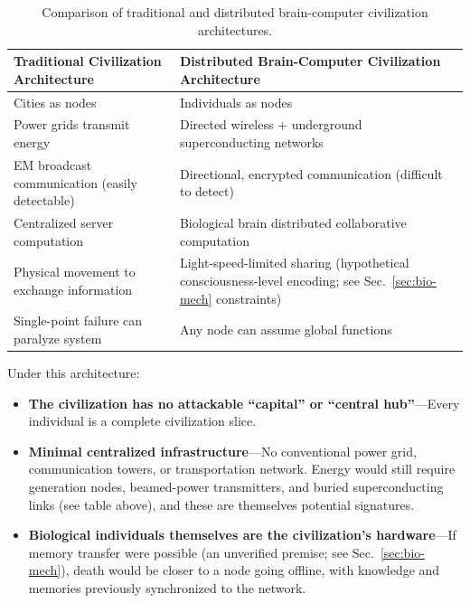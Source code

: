 \documentclass[aps,prd,twocolumn,superscriptaddress,nofootinbib]{revtex4-2}
\begin{document}
\begin{table}[htbp]
\caption{Comparison of traditional and distributed brain-computer civilization architectures.}
\label{tab:civ-architecture}
\footnotesize
\begin{tabular}{P{0.405\textwidth}P{0.516\textwidth}}
\toprule
Traditional Civilization Architecture & Distributed Brain-Computer Civilization Architecture \\
\midrule
Cities as nodes & Individuals as nodes \\
Power grids transmit energy & Directed wireless + underground superconducting networks \\
EM broadcast communication (easily detectable) & Directional, encrypted communication (difficult to detect) \\
Centralized server computation & Biological brain distributed collaborative computation \\
Physical movement to exchange information & Light-speed-limited sharing (hypothetical consciousness-level encoding; see Sec.~\ref{sec:bio-mech} constraints) \\
Single-point failure can paralyze system & Any node can assume global functions \\
\bottomrule
\end{tabular}
\end{table}

Under this architecture:

\begin{itemize}
  \item \textbf{The civilization has no attackable ``capital'' or ``central hub''}---Every individual is a complete civilization slice.
  \item \textbf{Minimal centralized infrastructure}---No conventional power grid, communication towers, or transportation network. Energy would still require generation nodes, beamed-power transmitters, and buried superconducting links (see table above), and these are themselves potential signatures.
  \item \textbf{Biological individuals themselves are the civilization's hardware}---If memory transfer were possible (an unverified premise; see Sec.~\ref{sec:bio-mech}), death would be closer to a node going offline, with knowledge and memories previously synchronized to the network.
\end{itemize}
\end{document}
